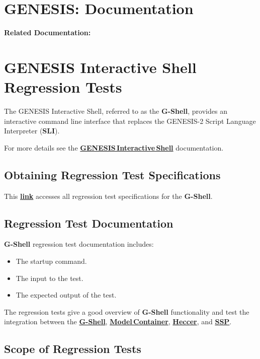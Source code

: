 \documentclass[12pt]{article}
\begin{document}
\section*{GENESIS: Documentation}

{\bf Related Documentation:}

\section*{GENESIS Interactive Shell Regression Tests}

The GENESIS Interactive Shell, referred to as the {\bf G-Shell}, provides an interactive command line interface that replaces the GENESIS-2 Script Language Interpreter ({\bf SLI}).

For more details see the \href{../gshell/gshell.tex}{\bf GENESIS\,Interactive\,Shell} documentation.

\subsection*{Obtaining Regression Test Specifications}

This \href{http://www.neurospaces.org/neurospaces_project/gshell/tests/html/specifications/main.html}{\bf link} accesses all regression test specifications for the {\bf G-Shell}.

\subsection*{Regression Test Documentation}

{\bf G-Shell} regression test documentation includes:
\begin{itemize}
\item The startup command.
\item The input to the test.
\item The expected output of the test.
\end{itemize}
The regression tests give a good overview of {\bf G-Shell} functionality and test the integration between the \href{../gshell/gshell.tex}{{\bf G-Shell}}, \href{../model-container/model-container.tex}{\bf Model\,Container}, \href{../heccer/heccer.tex}{\bf Heccer}, and \href{../ssp/ssp.tex}{\bf SSP}.

\subsection*{Scope of Regression Tests}
\end{document}
